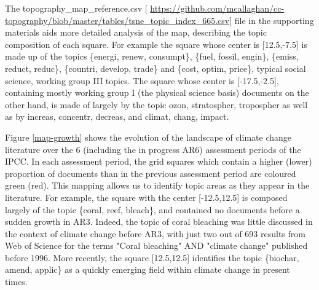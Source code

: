 \documentclass{article}
\begin{document}
\begin{linenumbers}
The topography\_map\_reference.csv [ \url{https://github.com/mcallaghan/cc-topography/blob/master/tables/tsne_topic_index_665.csv}] file in the supporting materials aids more detailed analysis of the map, describing the topic composition of each square. For example the square whose center is [12.5,-7.5] is made up of the topics \{energi, renew, consumpt\}, \{fuel, fossil, engin\}, \{emiss, reduct, reduc\}, \{countri, develop, trade\} and \{cost, optim, price\}, typical social science, working group III topics. The square whose center is [-17.5,-2.5], containing mostly working group I (the physical science basis) documents on the other hand, is made of largely by the topic {ozon, stratospher, tropospher} as well as by {increas, concentr, decreas}, and {climat, chang, impact}.

Figure \ref{map-growth} shows the evolution of the landscape of climate change literature over the 6 (including the in progress AR6) assessment periods of the IPCC. In each assessment period, the grid squares which contain a higher (lower) proportion of documents than in the previous assessment period are coloured green (red). This mapping allows us to identify topic areas as they appear in the literature. For example, the square with the center [-12.5,12.5] is composed largely of the topic \{coral, reef, bleach\}, and contained no documents before a sudden growth in AR3. Indeed, the topic of coral bleaching  was little discussed in the context of climate change before AR3, with just two out of 693 results from Web of Science for the terms  "Coral bleaching" AND "climate change" published before 1996. More recently, the square [12.5,12.5] identifies the topic \{biochar, amend, applic\} as a quickly emerging field within climate change in present times.


\end{linenumbers}
\end{document}
